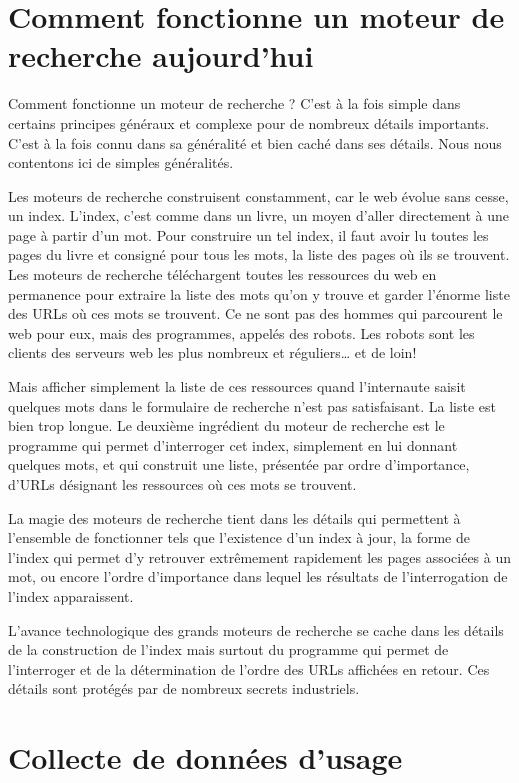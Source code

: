 \documentclass[12pt]{article}
\begin{document}
\section*{Comment fonctionne un moteur de recherche aujourd'hui}
\label{sec:orgheadline3}
Comment fonctionne un moteur de recherche ? C'est à la fois simple
dans certains principes généraux et complexe pour de nombreux détails
importants. C'est à la fois connu dans sa généralité et bien caché
dans ses détails. Nous nous contentons ici de simples généralités.

Les moteurs de recherche construisent constamment, car le web évolue
sans cesse, un index. L'index, c'est comme dans un livre, un moyen
d'aller directement à une page à partir d'un mot. Pour construire un
tel index, il faut avoir lu toutes les pages du livre et consigné pour
tous les mots, la liste des pages où ils se trouvent. Les moteurs de
recherche téléchargent toutes les ressources du web en permanence pour
extraire la liste des mots qu'on y trouve et garder l'énorme liste des
URLs où ces mots se trouvent. Ce ne sont pas des hommes qui parcourent
le web pour eux, mais des programmes, appelés des robots. Les robots
sont les clients des serveurs web les plus nombreux et réguliers\ldots{} et
de loin!

Mais afficher simplement la liste de ces ressources quand l'internaute
saisit quelques mots dans le formulaire de recherche n'est pas
satisfaisant. La liste est bien trop longue. Le deuxième ingrédient du
moteur de recherche est le programme qui permet d'interroger cet
index, simplement en lui donnant quelques mots, et qui construit une
liste, présentée par ordre d'importance, d'URLs désignant les
ressources où ces mots se trouvent.


La magie des moteurs de recherche tient dans les détails qui
permettent à l'ensemble de fonctionner tels que l'existence d'un index
à jour, la forme de l'index qui permet d'y retrouver extrêmement
rapidement les pages associées à un mot, ou encore l'ordre
d'importance dans lequel les résultats de l'interrogation de l'index
apparaissent.

L'avance technologique des grands moteurs de recherche se cache dans
les détails de la construction de l'index mais surtout du programme
qui permet de l'interroger et de la détermination de l'ordre des URLs
affichées en retour. Ces détails sont protégés par de nombreux secrets
industriels.

\section*{Collecte de données d'usage}
\label{sec:orgheadline4}
\end{document}
